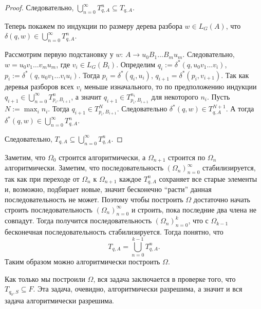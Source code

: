 \documentclass[12pt,a4paper]{article}
\begin{document}
\begin{problem}{2}
\begin{proof}
            Следовательно, $\bigcup_{n=0}^\infty T^n_{q, A} \subseteq T_{q, A}$.

            Теперь покажем по индукции по размеру дерева разбора $w \in L_G(A)$, что $\delta(q, w) \in \bigcup_{n=0}^\infty T^n_{q, A}$.

            Рассмотрим первую подстановку у $w$: $A \to u_0 B_1 \dots B_m u_m$. Следовательно, $w = u_0 v_1 \dots v_m u_m$, где $v_i \in L_G(B_i)$. Определим $q_i := \delta^*(q, u_0 v_1 \dots v_i)$, $p_i := \delta^*(q, u_0 v_1 \dots v_i u_i)$. Тогда $p_i = \delta^*(q_i, u_i)$, $q_{i+1} = \delta^*(p_i, v_{i+1})$. Так как деревья разборов всех $v_i$ меньше изначального, то по предположению индукции $q_{i+1} \in \bigcup_{n=0}^\infty T^n_{p_i, B_{i+1}}$, а значит $q_{i+1} \in T^{n_i}_{p_i, B_{i+1}}$ для некоторого $n_i$. Пусть $N := \max_i n_i$. Тогда $q_{i+1} \in T^N_{p_i, B_{i+1}}$. Следовательно $\delta^*(q, w) \in T^{N+1}_{q, A}$. А тогда $\delta^*(q, w) \in \bigcup_{n=0}^\infty T^n_{q, A}$.

            Следовательно, $T_{q, A} \subseteq \bigcup_{n=0}^\infty T^n_{q, A}$.
        \end{proof}

        Заметим, что $\Omega_0$ строится алгоритмически, а $\Omega_{n+1}$ строится по $\Omega_n$ алгоритмически. Заметим, что последовательность $(\Omega_n)_{n=0}^\infty$ стабилизируется, так как при переходе от $\Omega_n$ к $\Omega_{n+1}$ каждое $T^n_{q, A}$ сохраняет все старые элементы и, возможно, подбирает новые, значит бесконечно ``расти'' данная последовательность не может. Поэтому чтобы построить $\Omega$ достаточно начать строить последовательность $(\Omega_n)_{n=0}^\infty$ и строить, пока последние два члена не совпадут. Тогда получится последовательность $(\Omega_n)_{n=0}^k$, что с $\Omega_{k-1}$ бесконечная последовательность стабилизируется. Тогда понятно, что
        \[T_{q, A} = \bigcup_{n=0}^{k-1} T^n_{q, A}.\]
        Таким образом можно алгоритмически построить $\Omega$.

        Как только мы построили $\Omega$, вся задача заключается в проверке того, что $T_{q_0, S} \subseteq F$. Эта задача, очевидно, алгоритмически разрешима, а значит и вся задача алгоритмически разрешима.
    \end{problem}
\end{document}
